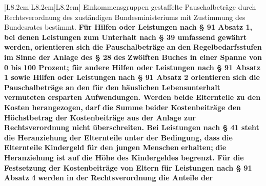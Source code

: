\documentclass[10pt,a4paper,landscape]{article}
\begin{document}
\begin{longtable}{|L{8.2cm}|L{8.2cm}|L{8.2cm}|}
\newline Einkommensgruppen gestaffelte  \newline Pauschalbeträge durch Rechtsverordnung  \newline des zuständigen Bundesministeriums mit  \newline Zustimmung des Bundesrates bestimmt.  \newline \textbf{\textcolor{diffgreen}{Für Hilfen oder Leistungen nach \S{} 91  \newline Absatz 1, bei denen Leistungen zum  \newline Unterhalt nach \S{} 39 umfassend gewährt  \newline werden,}}\textbf{ orientieren sich }\textbf{\textcolor{diffgreen}{die  \newline Pauschalbeträge}}\textbf{ an }\textbf{\textcolor{diffgreen}{den}}\textbf{   \newline Regelbedarfsstufen im Sinne der Anlage  \newline des \S{} 28 }\textbf{\textcolor{diffgreen}{des}}\textbf{ Zwölften Buches in einer  \newline Spanne von 0 bis }\textbf{\textcolor{diffgreen}{100 Prozent; für  \newline andere Hilfen oder Leistungen nach \S{} 91  \newline Absatz 1 sowie Hilfen oder Leistungen  \newline nach \S{} 91 Absatz 2 orientieren sich die  \newline Pauschalbeträge an den für den  \newline häuslichen Lebensunterhalt vermuteten  \newline ersparten Aufwendungen. Werden beide  \newline Elternteile zu den Kosten herangezogen,}}\textbf{  \newline darf die Summe beider Kostenbeiträge  \newline den Höchstbetrag der Kostenbeiträge  \newline aus der Anlage zur Rechtsverordnung  \newline nicht überschreiten. Bei Leistungen  \newline nach \S{} 41 steht die Heranziehung }\textbf{\textcolor{diffgreen}{der  \newline Elternteile}}\textbf{ unter der Bedingung, dass} \newline \textbf{\textcolor{diffgreen}{die Elternteile}}\textbf{ Kindergeld für den jungen  \newline Menschen }\textbf{\textcolor{diffgreen}{erhalten;}}\textbf{ die Heranziehung  \newline ist auf die Höhe des Kindergeldes  \newline begrenzt. Für die Festsetzung der  \newline Kostenbeiträge von Eltern für  \newline Leistungen nach \S{} 91 Absatz }\textbf{\textcolor{diffgreen}{4}}\textbf{ werden  \newline in der Rechtsverordnung die Anteile der} \newline 
\end{longtable}
\end{document}
